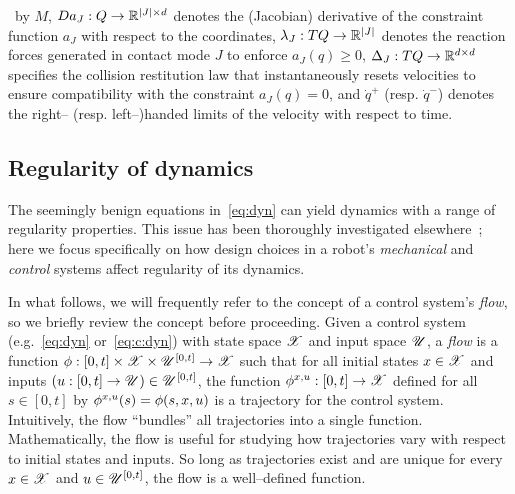 \documentclass{article}
\begin{document}
~by $M$,
$Da_J : Q \rightarrow \mathbb{R}^{\left| J \right|\times d}$ 
denotes the (Jacobian) derivative of the constraint function $a_J$ with respect to the coordinates,
$\lambda_J : TQ \rightarrow \mathbb{R}^{\left| J \right|}$ 
denotes the reaction forces generated in contact mode $J$ to enforce $a_J(q) \ge 0$,
$\Delta_J : TQ \rightarrow \mathbb{R}^{d\times d}$ 
specifies the collision restitution law that instantaneously resets velocities to ensure compatibility with the constraint $a_J(q) = 0$,
%
and
$\dot{q}^+$ (resp. $\dot{q}^-$) denotes the right-- (resp. left--)handed limits of the velocity with respect to time.
%

\subsection{Regularity of dynamics}
\label{sec:reg:dyn}
The seemingly benign equations in~\eqref{eq:dyn} 
can yield dynamics with a range of regularity properties.
This issue has been thoroughly investigated elsewhere~\cite{Pace2017-tt, Pace2017-ph, Ballard2000-ui};
here we focus specifically on how design choices in a robot's \emph{mechanical} and \emph{control} systems affect regularity of its dynamics.

In what follows, we will frequently refer to the concept of a control system's \emph{flow}, so we briefly review the concept before proceeding.
Given a control system (e.g.~\eqref{eq:dyn} or~\eqref{eq:c:dyn}) with state space $\mathscr{X}$ and input space $\mathscr{U}$, 
a \emph{flow} is a function
$\phi:[0,t]\times\mathscr{X}\times\mathscr{U}^{[0,t]}\rightarrow\mathscr{X}$
such that for all initial states $x\in\mathscr{X}$ and inputs $\left( u:[0,t]\rightarrow\mathscr{U} \right)\in\mathscr{U}^{[0,t]}$,
the function 
$\phi^{x,u}:[0,t]\rightarrow\mathscr{X}$ 
defined for all $s\in[0,t]$ by 
$\phi^{x,u}(s) = \phi(s,x,u)$
is a trajectory for the control system.
Intuitively, the flow ``bundles'' all trajectories into a single function.
Mathematically, the flow is useful for studying how trajectories vary with respect to initial states and inputs.
So long as trajectories exist and are unique for every $x\in\mathscr{X}$ and $u\in\mathscr{U}^{[0,t]}$, the flow is a well--defined function.
\end{document}
